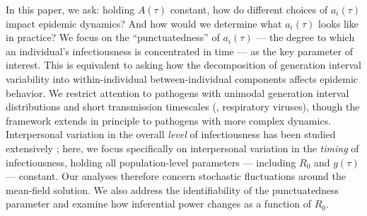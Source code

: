 In this paper, we ask: holding $A(\tau)$ constant, how do different choices of $a_i(\tau)$ impact epidemic dynamics? And how would we determine what $a_i(\tau)$ looks like in practice? We focus on the ``punctuatedness'' of $a_i(\tau)$ --- the degree to which an individual's infectiousness is concentrated in time --- as the key parameter of interest. This is equivalent to asking how the decomposition of generation interval variability into within-individual \vs between-individual components affects epidemic behavior. We restrict attention to pathogens with unimodal generation interval distributions and short transmission timescales (\eg, respiratory viruses), though the framework extends in principle to pathogens with more complex dynamics. Interpersonal variation in the overall \emph{level} of infectiousness has been studied extensively \citep{lloyd-smith_superspreading_2005}; here, we focus specifically on interpersonal variation in the \emph{timing} of infectiousness, holding all population-level parameters --- including $R_0$ and $g(\tau)$ --- constant. Our analyses therefore concern stochastic fluctuations around the mean-field solution. We also address the identifiability of the punctuatedness parameter and examine how inferential power changes as a function of $R_0$.





